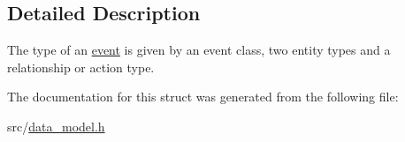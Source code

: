 \subsection{Detailed Description}
The type of an \hyperlink{structtricl_1_1event}{event} is given by an event class, two entity types and a relationship or action type. 

The documentation for this struct was generated from the following file\+:\begin{DoxyCompactItemize}
\item 
src/\hyperlink{data__model_8h}{data\+\_\+model.\+h}\end{DoxyCompactItemize}
